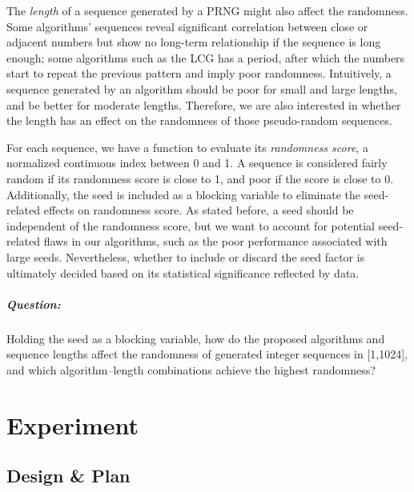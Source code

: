 \documentclass{report}
\begin{document}
The \textit{length} of a sequence generated by a PRNG might also affect the randomness. Some algorithms' sequences reveal significant correlation between close or adjacent numbers but show no long-term relationship if the sequence is long enough; some algorithms such as the LCG has a period, after which the numbers start to repeat the previous pattern and imply poor randomness. Intuitively, a sequence generated by an algorithm should be poor for small and large lengths, and be better for moderate lengths. Therefore, we are also interested in whether the length has an effect on the randomness of those pseudo-random sequences.

For each sequence, we have a function to evaluate its \textit{randomness score}, a normalized continuous index between 0 and 1. A sequence is considered fairly random if its randomness score is close to 1, and poor if the score is close to 0. Additionally, the seed is included as a blocking variable to eliminate the seed-related effects on randomness score. As stated before, a seed should be independent of the randomness score, but we want to account for potential seed-related flaws in our algorithms, such as the poor performance associated with large seeds. Nevertheless, whether to include or discard the seed factor is ultimately decided based on its statistical significance reflected by data.

\paragraph{Question:} Holding the seed as a blocking variable, how do the proposed algorithms and sequence lengths affect the randomness of generated integer sequences in [1,1024], and which algorithm–length combinations achieve the highest randomness?

\chapter{Experiment}
\section{Design \& Plan}
\end{document}
